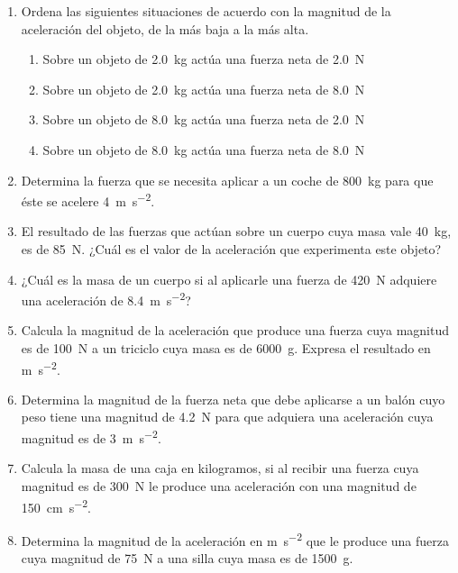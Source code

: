 \documentclass[14pt]{extarticle}
\begin{document}
\begin{enumerate}
\item Ordena las siguientes situaciones de acuerdo con la magnitud de la aceleración del objeto, de la más baja a la más alta.
\begin{enumerate}[label=\alph*)]
\item Sobre un objeto de \SI{2.0}{\kilo\gram} actúa una fuerza neta de \SI{2.0}{\newton}
\item Sobre un objeto de \SI{2.0}{\kilo\gram} actúa una fuerza neta de \SI{8.0}{\newton}
\item Sobre un objeto de \SI{8.0}{\kilo\gram} actúa una fuerza neta de \SI{2.0}{\newton}
\item Sobre un objeto de \SI{8.0}{\kilo\gram} actúa una fuerza neta de \SI{8.0}{\newton}
\end{enumerate}
\item Determina la fuerza que se necesita aplicar a un coche de \SI{800}{\kilo\gram} para que éste se acelere \SI{4}{\meter\per\square\second}.
\item El resultado de las fuerzas que actúan sobre un cuerpo cuya masa vale \SI{40}{\kilo\gram}, es de \SI{85}{\newton}. ¿Cuál es el valor de la aceleración que experimenta este objeto?
\item ¿Cuál es la masa de un cuerpo si al aplicarle una fuerza de \SI{420}{\newton} adquiere una aceleración de \SI{8.4}{\meter\per\square\second}?
\item Calcula la magnitud de la aceleración que produce una fuerza cuya magnitud es de \SI{100}{\newton} a un triciclo cuya masa es de \SI{6000}{\gram}. Expresa el resultado en \unit{\meter\per\square\second}.
\item Determina la magnitud de la fuerza neta que debe aplicarse a un balón cuyo peso tiene una magnitud de
\SI{4.2}{\newton} para que adquiera una aceleración cuya magnitud es de \SI{3}{\meter\per\square\second}.
\item Calcula la masa de una caja en kilogramos, si al recibir una fuerza cuya magnitud es de \SI{300}{\newton} le produce una aceleración con una magnitud de \SI{150}{\centi\meter\per\square\second}.
\item Determina la magnitud de la aceleración en \unit{\meter\per\square\second} que le produce una fuerza cuya magnitud de \SI{75}{\newton} a una silla cuya masa es de \SI{1500}{\gram}.
\end{enumerate}
\end{document}
